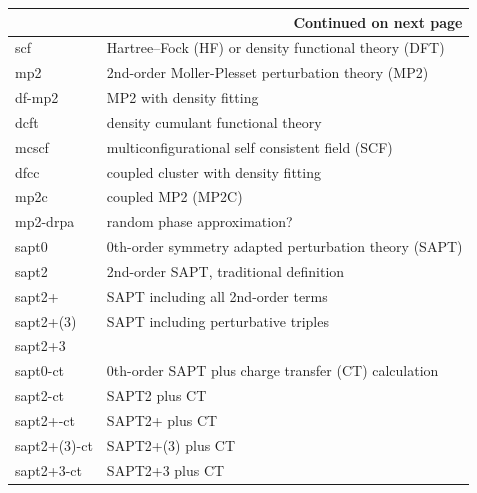 \documentclass[letterpaper,10pt,english]{sphinxmanual}
\begin{document}
\begin{fulllineitems}
\begin{longtable}{|l|l|}
\hline \multicolumn{2}{|r|}{{Continued on next page}} \\ \hline
\endfoot

\hline
\endlastfoot


scf
 & 
Hartree--Fock (HF) or density functional theory (DFT)
\\\hline

mp2
 & 
2nd-order Moller-Plesset perturbation theory (MP2)
\\\hline

df-mp2
 & 
MP2 with density fitting
\\\hline

dcft
 & 
density cumulant functional theory
\\\hline

mcscf
 & 
multiconfigurational self consistent field (SCF)
\\\hline

dfcc
 & 
coupled cluster with density fitting
\\\hline

mp2c
 & 
coupled MP2 (MP2C)
\\\hline

mp2-drpa
 & 
random phase approximation?
\\\hline

sapt0
 & 
0th-order symmetry adapted perturbation theory (SAPT)
\\\hline

sapt2
 & 
2nd-order SAPT, traditional definition
\\\hline

sapt2+
 & 
SAPT including all 2nd-order terms
\\\hline

sapt2+(3)
 & 
SAPT including perturbative triples
\\\hline

sapt2+3
 & \\\hline

sapt0-ct
 & 
0th-order SAPT plus charge transfer (CT) calculation
\\\hline

sapt2-ct
 & 
SAPT2 plus CT
\\\hline

sapt2+-ct
 & 
SAPT2+ plus CT
\\\hline

sapt2+(3)-ct
 & 
SAPT2+(3) plus CT
\\\hline

sapt2+3-ct
 & 
SAPT2+3 plus CT
\\\hline


\end{longtable}
\end{fulllineitems}
\end{document}
